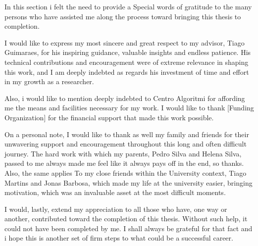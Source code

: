 In this section i felt the need to provide a Special words of gratitude to the many persons who have assisted me along the process toward bringing this thesis to completion.

I would like to express my most sincere and great respect to my advisor, Tiago Guimaraes, for his inspiring guidance, valuable insights and endless patience. His technical contributions and encouragement were of extreme relevance in shaping this work, and I am deeply indebted as regards his investment of time and effort in my growth as a researcher.

Also, i would like to mention deeply indebted to Centro Algoritmi for affording me the means and facilities necessary for my work. I would like to thank [Funding Organization] for the financial support that made this work possible.

 On a personal note, I would like to thank as well my family and friends for their unwavering support and encouragement throughout this long and often difficult journey. The hard work with which my parents, Pedro Silva and Helena Silva, passed to me always made me feel like it always pays off in the end, so thanks. Also, the same applies To my close friends within the University context, Tiago Martins and Jonas Barbosa, which made my life at the university easier, bringing motivation, which was an invaluable asset at the most difficult moments.

I would, lastly, extend my appreciation to all those who have, one way or another, contributed toward the completion of this thesis. Without such help, it could not have been completed by me. I shall always be grateful for that fact and i hope this is another set of firm steps to what could be a successful career.

\newpage
